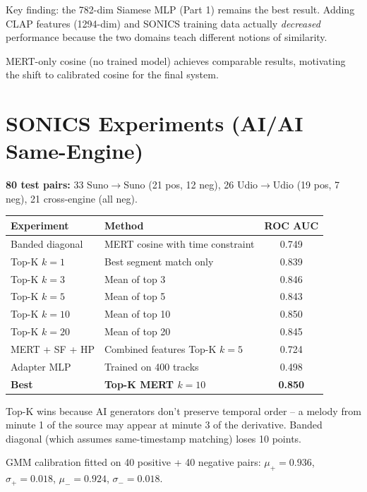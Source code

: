 \documentclass[10pt,a4paper]{article}
\begin{document}
Key finding: the 782-dim Siamese MLP (Part 1) remains the best result.
Adding CLAP features (1294-dim) and SONICS training data actually
\emph{decreased} performance because the two domains teach different
notions of similarity.

MERT-only cosine (no trained model) achieves comparable results,
motivating the shift to calibrated cosine for the final system.

\section{SONICS Experiments (AI/AI Same-Engine)}

\textbf{80 test pairs:} 33 Suno$\to$Suno (21 pos, 12 neg),
26 Udio$\to$Udio (19 pos, 7 neg), 21 cross-engine (all neg).

\begin{center}
\begin{tabular}{llc}
\toprule
Experiment & Method & ROC AUC \\
\midrule
Banded diagonal & MERT cosine with time constraint & 0.749 \\
Top-K $k=1$ & Best segment match only & 0.839 \\
Top-K $k=3$ & Mean of top 3 & 0.846 \\
Top-K $k=5$ & Mean of top 5 & 0.843 \\
Top-K $k=10$ & Mean of top 10 & 0.850 \\
Top-K $k=20$ & Mean of top 20 & 0.845 \\
MERT + SF + HP & Combined features Top-K $k=5$ & 0.724 \\
Adapter MLP & Trained on 400 tracks & 0.498 \\
\midrule
\textbf{Best} & \textbf{Top-K MERT $k=10$} & \textbf{0.850} \\
\bottomrule
\end{tabular}
\end{center}

Top-K wins because AI generators don't preserve temporal order -- a melody
from minute 1 of the source may appear at minute 3 of the derivative.
Banded diagonal (which assumes same-timestamp matching) loses 10 points.

GMM calibration fitted on 40 positive + 40 negative pairs:
$\mu_+ = 0.936$, $\sigma_+ = 0.018$,
$\mu_- = 0.924$, $\sigma_- = 0.018$.
\end{document}
